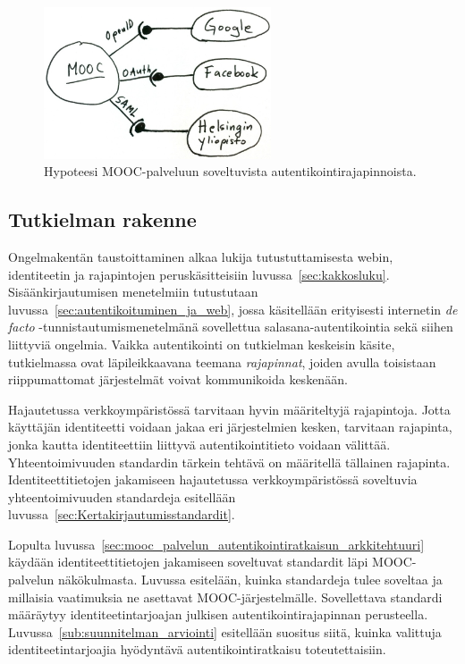 \documentclass[finnish,gradu]{tktltiki}
\begin{document}
\begin{figure}
  \centering
  \includegraphics[width=0.6\textwidth]{images/mooc-autentikointirajapinnat.jpg}
  \caption{Hypoteesi MOOC-palveluun soveltuvista autentikointirajapinnoista.}
  \label{fig:mooc-autentikointirajapinnat}
\end{figure}




\subsection{Tutkielman rakenne} %
\label{sub:tutkielman_rakenne}

  Ongelmakentän taustoittaminen alkaa lukija tutustuttamisesta webin, identiteetin ja rajapintojen peruskäsitteisiin luvussa~\ref{sec:kakkosluku}. Sisäänkirjautumisen menetelmiin tutustutaan luvussa~\ref{sec:autentikoituminen_ja_web}, jossa käsitellään erityisesti internetin \emph{de facto} -tun\-nistau\-tumisme\-ne\-tel\-mänä sovellettua salasana-autentikointia sekä siihen liittyviä ongelmia. Vaikka autentikointi on tutkielman keskeisin käsite, tutkielmassa ovat läpileikkaavana teemana \emph{rajapinnat}, joiden avulla toisistaan riippumattomat järjestelmät voivat kommunikoida keskenään.

  Hajautetussa verkkoympäristössä tarvitaan hyvin määriteltyjä rajapintoja. Jotta käyttäjän identiteetti voidaan jakaa eri järjestelmien kesken, tarvitaan rajapinta, jonka kautta identiteettiin liittyvä autentikointitieto voidaan välittää. Yhteentoimivuuden standardin tärkein tehtävä on määritellä tällainen rajapinta. Identiteettitietojen jakamiseen hajautetussa verkkoympäristössä soveltuvia yhteentoimivuuden standardeja esitellään luvussa~\ref{sec:Kertakirjautumisstandardit}.

  Lopulta luvussa~\ref{sec:mooc_palvelun_autentikointiratkaisun_arkkitehtuuri} käydään identiteettitietojen jakamiseen soveltuvat standardit läpi MOOC-palvelun näkökulmasta. Luvussa esitelään, kuinka standardeja tulee soveltaa ja millaisia vaatimuksia ne asettavat MOOC-järjestelmälle. Sovellettava standardi määräytyy identiteetintarjoajan julkisen autentikointirajapinnan perusteella. Luvussa~\ref{sub:suunnitelman_arviointi} esitellään suositus siitä, kuinka valittuja identiteetintarjoajia hyödyntävä autentikointiratkaisu toteutettaisiin.
\end{document}
